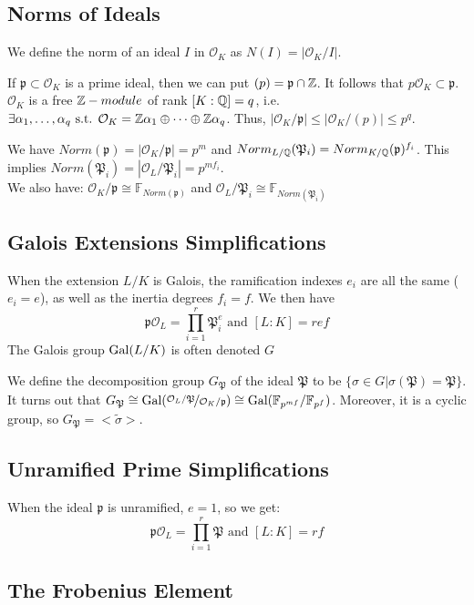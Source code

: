 \subsection{Norms of Ideals}
We define the norm of an ideal $I$ in $\mathcal{O}_K$ as $N(I)=|\mathcal{O}_K/I|$.

If $\mathfrak{p} \subset \mathcal{O}_K$ is a prime ideal, then we can put $(p)=\mathfrak{p} \cap \mathbb{Z}$.
It follows that $p\mathcal{O}_K \subset \mathfrak{p}$.
$\mathcal{O}_K$ is a free $\mathbb{Z}-module$ of rank $[K:\mathbb{Q}]=q$, i.e. $\exists \alpha_1,\dots,\alpha_q \text{ s.t. } \mathcal{O}_K=\mathbb{Z} \alpha_1 \oplus \cdots \oplus \mathbb{Z} \alpha_q$.
Thus, $|\mathcal{O}_K/\mathfrak{p}| \leq |\mathcal{O}_K/(p)| \leq p^q$.

We have $Norm(\mathfrak{p})=|\mathcal{O}_K/\mathfrak{p}|=p^m$
and $Norm_{L/\mathbb{Q}}(\mathfrak{P}_i) = Norm_{K/\mathbb{Q}}(\mathfrak{p})^{f_i}$.
This implies $Norm(\mathfrak{P}_i)=|\mathcal{O}_L/\mathfrak{P}_i|=p^{mf_i}$.\\
We also have: $\mathcal{O}_K/\mathfrak{p} \cong \mathbb{F}_{Norm(\mathfrak{p})}$
and $\mathcal{O}_L/\mathfrak{P}_i \cong \mathbb{F}_{Norm(\mathfrak{P}_i)}$

\subsection{Galois Extensions Simplifications}
When the extension $L/K$ is Galois, the ramification indexes $e_i$ are all the same ($e_i=e$), as well as the inertia degrees $f_i=f$.
We then have $$\mathfrak{p}\mathcal{O}_L = \prod_{i=1}^r \mathfrak{P}_i^{e} \text{ and } [L:K] = ref$$
The Galois group $\text{Gal}(L/K)$ is often denoted $G$

We define the decomposition group $G_{\mathfrak{P}}$ of the ideal $\mathfrak{P}$ to be $\{\sigma \in G | \sigma(\mathfrak{P})=\mathfrak{P} \}$.
It turns out that $G_{\mathfrak{P}} \cong \text{Gal}(\nicefrac{\mathcal{O}_L/\mathfrak{P}}{\mathcal{O}_K/\mathfrak{p}}) \cong \text{Gal}( \mathbb{F}_{p^{mf}}/\mathbb{F}_{p^{f}})$.
Moreover, it is a cyclic group, so $G_{\mathfrak{P}} = <\tilde{\sigma}>$.

\subsection{Unramified Prime Simplifications}
When the ideal $\mathfrak{p}$ is unramified, $e=1$, so we get:
$$\mathfrak{p}\mathcal{O}_L = \prod_{i=1}^r \mathfrak{P} \text{ and } [L:K] = rf$$

\subsection{The Frobenius Element}
